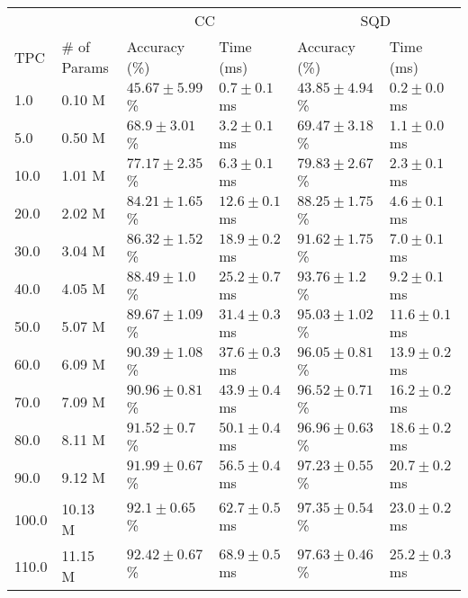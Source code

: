 \begin{table*}[t]
    \forceversofloat
	\begin{tabular}{llllll}
		\hline
				&              & \multicolumn{2}{c}{CC}		& \multicolumn{2}{c}{SQD}\\
		TPC     & \# of Params & Accuracy (\%) & Time (ms)  & Accuracy (\%) & Time (ms)\\
		\hline
		1.0     & 0.10 M       & $ 45.67 \pm 5.99$ \%    &       $ 0.7 \pm 0.1$ ms & $ 43.85 \pm 4.94$ \%    &       $ 0.2 \pm 0.0$ ms \\
		5.0     & 0.50 M       & $ 68.9 \pm 3.01$ \%     &       $ 3.2 \pm 0.1$ ms & $ 69.47 \pm 3.18$ \%    &       $ 1.1 \pm 0.0$ ms\\
		10.0    & 1.01 M       & $ 77.17 \pm 2.35$ \%    &       $ 6.3 \pm 0.1$ ms & $ 79.83 \pm 2.67$ \%    &       $ 2.3 \pm 0.1$ ms\\
		20.0    & 2.02 M       & $ 84.21 \pm 1.65$ \%    &       $ 12.6 \pm 0.1$ ms & $ 88.25 \pm 1.75$ \%    &       $ 4.6 \pm 0.1$ ms\\
		30.0    & 3.04 M       & $ 86.32 \pm 1.52$ \%    &       $ 18.9 \pm 0.2$ ms & $ 91.62 \pm 1.75$ \%    &       $ 7.0 \pm 0.1$ ms\\
		40.0    & 4.05 M       & $ 88.49 \pm 1.0$ \%     &       $ 25.2 \pm 0.7$ ms & $ 93.76 \pm 1.2$ \%     &       $ 9.2 \pm 0.1$ ms\\
		50.0    & 5.07 M       & $ 89.67 \pm 1.09$ \%    &       $ 31.4 \pm 0.3$ ms & $ 95.03 \pm 1.02$ \%    &       $ 11.6 \pm 0.1$ ms\\
		60.0    & 6.09 M       & $ 90.39 \pm 1.08$ \%    &       $ 37.6 \pm 0.3$ ms & $ 96.05 \pm 0.81$ \%    &       $ 13.9 \pm 0.2$ ms\\
		70.0    & 7.09 M       & $ 90.96 \pm 0.81$ \%    &       $ 43.9 \pm 0.4$ ms & $ 96.52 \pm 0.71$ \%    &       $ 16.2 \pm 0.2$ ms\\
		80.0    & 8.11 M       & $ 91.52 \pm 0.7$ \%     &       $ 50.1 \pm 0.4$ ms & $ 96.96 \pm 0.63$ \%    &       $ 18.6 \pm 0.2$ ms\\
		90.0    & 9.12 M       & $ 91.99 \pm 0.67$ \%    &       $ 56.5 \pm 0.4$ ms & $ 97.23 \pm 0.55$ \%    &       $ 20.7 \pm 0.2$ ms\\
		100.0   & 10.13 M      & $ 92.1 \pm 0.65$ \%     &       $ 62.7 \pm 0.5$ ms & $ 97.35 \pm 0.54$ \%    &       $ 23.0 \pm 0.2$ ms\\
		110.0   & 11.15 M      & $ 92.42 \pm 0.67$ \%    &       $ 68.9 \pm 0.5$ ms & $ 97.63 \pm 0.46$ \%    &       $ 25.2 \pm 0.3$ ms\\

\end{tabular}
\end{table*}
